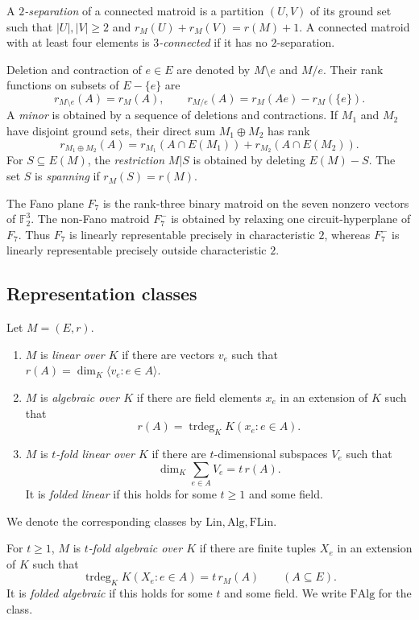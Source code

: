 \documentclass[11pt]{article}
\theoremstyle{definition}
\newcommand{\trdeg}{\operatorname{trdeg}}
\newcommand{\FAlg}{\mathrm{FAlg}}
\newcommand{\FLin}{\mathrm{FLin}}
\newcommand{\Alg}{\mathrm{Alg}}
\newcommand{\Lin}{\mathrm{Lin}}
\begin{document}
A \emph{$2$-separation} of a connected matroid is a partition $(U,V)$ of its ground set such that $|U|,|V|\ge2$ and $r_M(U)+r_M(V)=r(M)+1$.  A connected matroid with at least four elements is \emph{$3$-connected} if it has no $2$-separation.

Deletion and contraction of $e\in E$ are denoted by $M\setminus e$ and $M/e$.  Their rank functions on subsets of $E-\{e\}$ are
\[
r_{M\setminus e}(A)=r_M(A),
\qquad
r_{M/e}(A)=r_M(Ae)-r_M(\{e\}).
\]
A \emph{minor} is obtained by a sequence of deletions and contractions.  If $M_1$ and $M_2$ have disjoint ground sets, their direct sum $M_1\oplus M_2$ has rank
\[
r_{M_1\oplus M_2}(A)=r_{M_1}(A\cap E(M_1))+r_{M_2}(A\cap E(M_2)).
\]
For $S\subseteq E(M)$, the \emph{restriction} $M|S$ is obtained by deleting $E(M)-S$.  The set $S$ is \emph{spanning} if $r_M(S)=r(M)$.

The Fano plane $F_7$ is the rank-three binary matroid on the seven nonzero vectors of $\mathbb F_2^3$.  The non-Fano matroid $F_7^-$ is obtained by relaxing one circuit-hyperplane of $F_7$.  Thus $F_7$ is linearly representable precisely in characteristic $2$, whereas $F_7^-$ is linearly representable precisely outside characteristic $2$.

\subsection{Representation classes}\label{subsec:representation-classes}

\begin{definition}\label{def:classical}
Let $M=(E,r)$.
\begin{enumerate}[label=(\roman*)]
\item $M$ is \emph{linear over $K$} if there are vectors $v_e$ such that $r(A)=\dim_K\langle v_e:e\in A\rangle$.
\item $M$ is \emph{algebraic over $K$} if there are field elements $x_e$ in an extension of $K$ such that
\[
r(A)=\trdeg_K K(x_e:e\in A).
\]
\item $M$ is \emph{$t$-fold linear over $K$} if there are $t$-dimensional subspaces $V_e$ such that
\[
\dim_K\sum_{e\in A}V_e=t\,r(A).
\]
It is \emph{folded linear} if this holds for some $t\ge1$ and some field.
\end{enumerate}
We denote the corresponding classes by $\Lin,\Alg,\FLin$.
\end{definition}

\begin{definition}\label{def:falg}
For $t\ge1$, $M$ is \emph{$t$-fold algebraic over $K$} if there are finite tuples $X_e$ in an extension of $K$ such that
\begin{equation}\label{eq:falg}
\trdeg_K K(X_e:e\in A)=t\,r_M(A)\qquad(A\subseteq E).
\end{equation}
It is \emph{folded algebraic} if this holds for some $t$ and some field.  We write $\FAlg$ for the class.
\end{definition}
\end{document}
